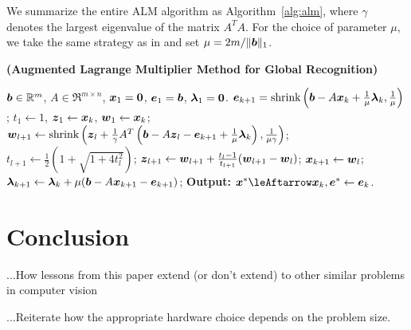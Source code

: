 \documentclass[10pt,twocolumn,letterpaper]{article}
\begin{document}
We summarize the entire ALM
algorithm as Algorithm~\ref{alg:alm}, where $\gamma$ denotes the
largest eigenvalue of the matrix $A^TA$. For the choice of parameter $\mu$, we take the same strategy as
in \cite{YangJ2009-pp} and set $\mu = 2m / \|\boldsymbol{b}\|_1$.
\begin{algorithm}[h]
\caption{\bf (Augmented Lagrange Multiplier Method for Global
Recognition)}
\begin{algorithmic}[1]
 $\boldsymbol{b} \in \mathbb R^m$, $A \in \Re^{m \times n}$,
${\boldsymbol{x}}_1 = \boldsymbol{0}$, $\boldsymbol{e}_1 = \boldsymbol{b}$, $\boldsymbol{\lambda}_1 =
\boldsymbol{0}$.
\STATE $\boldsymbol{e}_{k+1} = \textup{shrink}\left(\boldsymbol{b} - A{\boldsymbol{x}}_k +
\frac{1}{\mu}\boldsymbol{\lambda}_k, \frac{1}{\mu}\right)$;
\STATE $t_1\leftarrow 1$, $\boldsymbol{z}_1 \leftarrow {\boldsymbol{x}}_k$, $\boldsymbol{w}_1 \leftarrow {\boldsymbol{x}}_k$;
\STATE $\boldsymbol{w}_{l+1} \leftarrow \textup{shrink}\left(\boldsymbol{z}_l +
\frac{1}{\gamma}A^T\left(\boldsymbol{b} - A\boldsymbol{z}_l - \boldsymbol{e}_{k+1} +
\frac{1}{\mu}\boldsymbol{\lambda}_k\right), \frac{1}{\mu\gamma}\right)$;
\STATE $t_{l+1} \leftarrow \frac{1}{2}\left( 1 +
\sqrt{1+4t_l^2}\right)$;
\STATE $\boldsymbol{z}_{l+1} \leftarrow \boldsymbol{w}_{l+1} + \frac{t_l - 1}{t_{l+1}}(\boldsymbol{w}_{l+1} - \boldsymbol{w}_l)$;
\ENDWHILE
\STATE ${\boldsymbol{x}}_{k+1} \leftarrow \boldsymbol{w}_{l}$;
\STATE $\boldsymbol{\lambda}_{k+1} \leftarrow \boldsymbol{\lambda}_k + \mu (\boldsymbol{b} - A{\boldsymbol{x}}_{k+1} - \boldsymbol{e}_{k+1})$;
\ENDWHILE \STATE
{\bf Output:} $\x^* \leAftarrow \x_k, \e^* \leftarrow \e_k$.
\end{algorithmic}
\label{alg:alm}
\end{algorithm}


\section{Conclusion}
...How lessons from this paper extend (or don't extend) to other similar problems in computer vision

...Reiterate how the appropriate hardware choice depends on the problem size.

{\small


}
\end{document}
